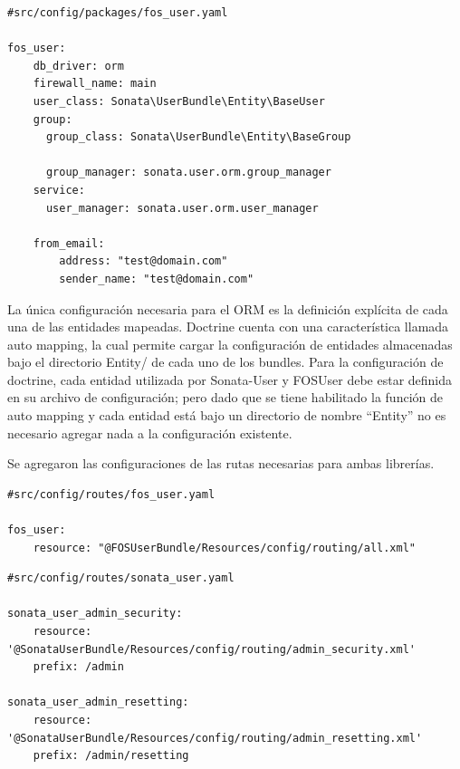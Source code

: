 \begin{lstlisting}[caption={archivo de configuración de FOSUser\\ Fuente: \sonatainstallation.}]
#src/config/packages/fos_user.yaml

fos_user:
    db_driver: orm
    firewall_name: main
    user_class: Sonata\UserBundle\Entity\BaseUser
    group:
      group_class: Sonata\UserBundle\Entity\BaseGroup

      group_manager: sonata.user.orm.group_manager
    service:
      user_manager: sonata.user.orm.user_manager

    from_email:
        address: "test@domain.com"
        sender_name: "test@domain.com"

\end{lstlisting}



La única configuración necesaria para el ORM es la definición explícita de cada una de las entidades mapeadas.
Doctrine cuenta con una característica llamada auto mapping, la cual permite cargar la configuración de entidades almacenadas bajo el directorio Entity/
de cada uno de los bundles.
Para la configuración de doctrine, cada entidad utilizada por Sonata-User y FOSUser debe estar definida en su archivo de configuración; pero dado que se
tiene habilitado la función de auto mapping y cada entidad está bajo un directorio de nombre “Entity” no es necesario agregar nada a la configuración existente.



Se agregaron las configuraciones de las rutas necesarias para ambas librerías.



\begin{lstlisting}[caption={archivo de configuración de rutas de FOSUser\\Fuente: \sonatainstallation.}]
#src/config/routes/fos_user.yaml

fos_user:
    resource: "@FOSUserBundle/Resources/config/routing/all.xml"
\end{lstlisting}

\begin{lstlisting}[caption={archivo de configuración de rutas de sonata-user\\Fuente: \sonatainstallation.}]
#src/config/routes/sonata_user.yaml

sonata_user_admin_security:
    resource: '@SonataUserBundle/Resources/config/routing/admin_security.xml'
    prefix: /admin

sonata_user_admin_resetting:
    resource: '@SonataUserBundle/Resources/config/routing/admin_resetting.xml'
    prefix: /admin/resetting

\end{lstlisting}

